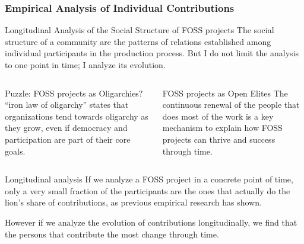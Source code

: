 \documentclass[ignorenonframetext,red,8pt,notes=hide]{beamer}
\begin{document}
\begin{frame}
\frametitle{Empirical Analysis of Individual Contributions}


\begin{block}{Longitudinal Analysis of the Social Structure of FOSS projects}
The social structure of a community are the patterns of relations established among individual participants in the production process. But I do not limit the analysis to one point in time; I analyze its evolution.
\end{block}

\pause


\begin{columns}[c]
\begin{column}{0.5\textwidth}
\begin{block}{Puzzle: FOSS projects as Oligarchies?}
\citet{michels:1915} ``iron law of oligarchy'' states that organizations tend towards oligarchy as they grow, even if democracy and participation are part of their core goals.
\end{block}
\end{column}

\begin{column}{0.5\textwidth}
\begin{block}{FOSS projects as Open Elites}
The continuous renewal of the people that does most of the work is a key mechanism to explain how FOSS projects can thrive and success through time.
\end{block}
\end{column}
\end{columns}

\pause

\begin{block}{Longitudinal analysis}
If we analyze a FOSS project in a concrete point of time, only a very small fraction of the participants are the ones that actually do the lion's share of contributions, as previous empirical research has shown.

However if we analyze the evolution of contributions longitudinally, we find that the persons that contribute the most change through time.
\end{block}

\end{frame}
\end{document}
